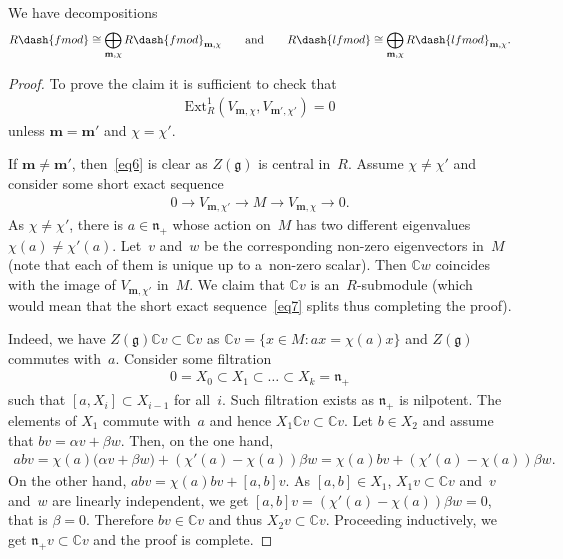 \documentclass[pdftex]{sigma}
\begin{document}
\begin{proposition}%
We have decompositions
\begin{gather*}
R\dash{fmod}\cong\bigoplus_{\mathbf{m},\chi}R\dash{fmod}_{\mathbf{m},\chi}
\qquad
\text{and}
\qquad
R\dash{lfmod}\cong\bigoplus_{\mathbf{m},\chi}R\dash{lfmod}_{\mathbf{m},\chi}.
\end{gather*}
\end{proposition}

\begin{proof}
To prove the claim it is suf\/f\/icient to check that
\begin{gather}
\label{eq6}
\mathrm{Ext}_R^1(V_{\mathbf{m},\chi},V_{\mathbf{m}',\chi'})=0
\end{gather}
unless $\mathbf{m}=\mathbf{m}'$ and $\chi=\chi'$.

If $\mathbf{m}\neq\mathbf{m}'$, then~\eqref{eq6} is clear as $Z(\mathfrak{g})$ is central in~$R$.
Assume $\chi\neq \chi'$ and consider some short exact sequence
\begin{gather}
\label{eq7}
0\to V_{\mathbf{m},\chi'}\to M\to V_{\mathbf{m},\chi}\to 0.
\end{gather}
As $\chi\neq\chi'$, there is $a\in \mathfrak{n}_+$ whose action on~$M$ has two dif\/ferent eigenvalues $\chi(a)\neq
\chi'(a)$.
Let~$v$ and~$w$ be the corresponding non-zero eigenvectors in~$M$ (note that each of them is unique up to a~non-zero
scalar).
Then $\mathbb{C}w$ coincides with the image of $V_{\mathbf{m},\chi'}$ in~$M$.
We claim that $\mathbb{C}v$ is an~$R$-submodule (which would mean that the short exact sequence~\eqref{eq7} splits thus
completing the proof).

Indeed, we have $Z(\mathfrak{g})\mathbb{C}v\subset \mathbb{C}v$ as $\mathbb{C}v=\{x\in M: ax=\chi(a)x\}$ and
$Z(\mathfrak{g})$ commutes with~$a$.
Consider some f\/iltration
\begin{gather*}
0=X_0\subset X_1\subset \dots \subset X_k=\mathfrak{n}_+
\end{gather*}
such that $[a,X_i]\subset X_{i-1}$ for all~$i$.
Such f\/iltration exists as $\mathfrak{n}_+$ is nilpotent.
The elements of $X_1$ commute with~$a$ and hence $X_1\mathbb{C}v\subset \mathbb{C}v$.
Let $b\in X_2$ and assume that $bv=\alpha v+\beta w$.
Then, on the one hand,
\begin{gather*}
abv=\chi(a)\big(\alpha v+\beta w\big)+ (\chi'(a)-\chi(a))\beta w= \chi(a)bv+ (\chi'(a)-\chi(a))\beta w.
\end{gather*}
On the other hand, $abv=\chi(a)bv+[a,b]v$.
As $[a,b]\in X_1$, $X_1v\subset \mathbb{C}v$ and~$v$ and~$w$ are linearly independent, we get
$[a,b]v=(\chi'(a)-\chi(a))\beta w=0$, that is $\beta=0$.
Therefore $bv\in \mathbb{C}v$ and thus $X_2v\subset \mathbb{C}v$.
Proceeding inductively, we get $\mathfrak{n}_+v\subset \mathbb{C}v$ and the proof is complete.
\end{proof}
\end{document}
